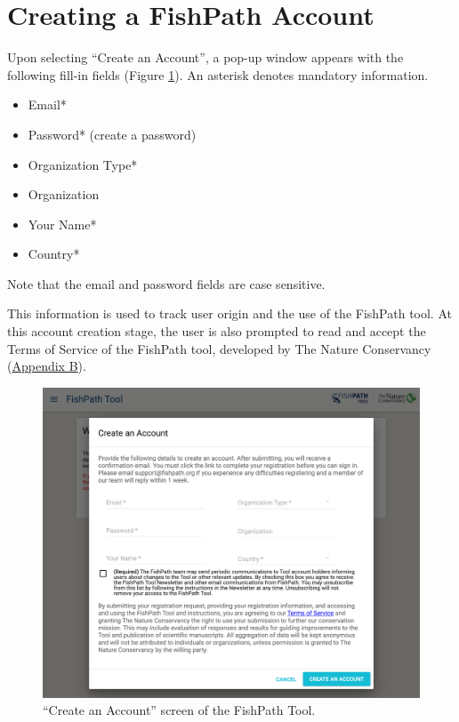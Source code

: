 \documentclass[
  11pt,
]{book}
\providecommand{\tightlist}{%
  \setlength{\itemsep}{0pt}\setlength{\parskip}{0pt}}
\begin{document}
\hypertarget{creating-a-fishpath-account}{%
\section{Creating a FishPath Account}\label{creating-a-fishpath-account}}

Upon selecting ``Create an Account'', a pop-up window appears with the following fill-in fields (Figure \ref{fig:create-account}). An asterisk denotes mandatory information.

\begin{itemize}
\tightlist
\item
  Email*
\item
  Password* (create a password)
\item
  Organization Type*
\item
  Organization
\item
  Your Name*
\item
  Country*
\end{itemize}

Note that the email and password fields are case sensitive.

This information is used to track user origin and the use of the FishPath tool. At this account creation stage, the user is also prompted to read and accept the Terms of Service of the FishPath tool, developed by The Nature Conservancy (\protect\hyperlink{terms}{Appendix B}).

\begin{figure}

{\centering \includegraphics[width=0.95\linewidth]{images/create-account} 

}

\caption{“Create an Account” screen of the FishPath Tool.}\label{fig:create-account}
\end{figure}
\end{document}
